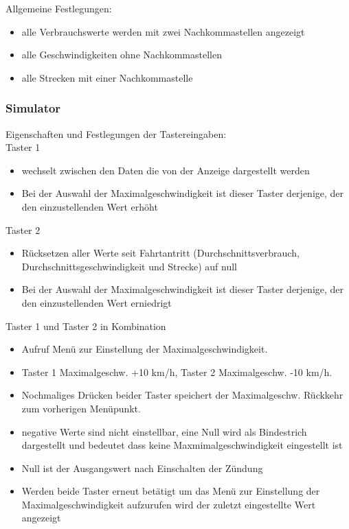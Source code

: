 \documentclass[a4paper,12pt]{article}
\begin{document}
Allgemeine Festlegungen:

\begin{itemize}

	\item alle Verbrauchswerte werden mit zwei Nachkommastellen angezeigt
	\item alle Geschwindigkeiten ohne Nachkommastellen
	\item alle Strecken mit einer Nachkommastelle

\end{itemize}

\subsubsection{Simulator}

Eigenschaften und Festlegungen der Tastereingaben:\\

Taster 1
\begin{itemize}

	\item wechselt zwischen den Daten die von der Anzeige dargestellt werden
	\item Bei der Auswahl der Maximalgeschwindigkeit ist dieser Taster derjenige, der den einzustellenden Wert erhöht

\end{itemize}

Taster 2
\begin{itemize}

	\item Rücksetzen aller Werte seit Fahrtantritt (Durchschnittsverbrauch, Durchschnittsgeschwindigkeit und Strecke) auf null
	\item Bei der Auswahl der Maximalgeschwindigkeit ist dieser Taster derjenige, der den einzustellenden Wert erniedrigt
	
\end{itemize}

Taster 1 und Taster 2 in Kombination
\begin{itemize}

	\item Aufruf Menü zur Einstellung der Maximalgeschwindigkeit.
	\item Taster 1 Maximalgeschw. +10 km/h, Taster 2 Maximalgeschw. -10 km/h.
	\item Nochmaliges Drücken beider Taster speichert der Maximalgeschw. Rückkehr zum vorherigen Menüpunkt.
	\item negative Werte sind nicht einstellbar, eine Null wird als Bindestrich dargestellt und bedeutet dass keine Maxmimalgeschwindigkeit eingestellt ist
	\item Null ist der Ausgangswert nach Einschalten der Zündung
	\item Werden beide Taster erneut betätigt um das Menü zur Einstellung der Maximalgeschwindigkeit aufzurufen wird der zuletzt eingestellte Wert angezeigt
	
\end{itemize}
\end{document}
